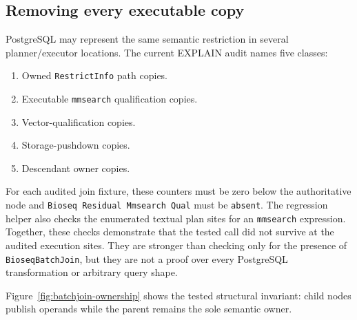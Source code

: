 \subsection{Removing every executable copy}

PostgreSQL may represent the same semantic restriction in several
planner/executor locations.  The current EXPLAIN audit names five classes:

\begin{enumerate}
  \item Owned \texttt{RestrictInfo} path copies.
  \item Executable \texttt{mmsearch} qualification copies.
  \item Vector-qualification copies.
  \item Storage-pushdown copies.
  \item Descendant owner copies.
\end{enumerate}

For each audited join fixture, these counters must be zero below the
authoritative node and \texttt{Bioseq Residual Mmsearch Qual} must be
\texttt{absent}.  The regression helper also checks the enumerated textual
plan sites for an \texttt{mmsearch} expression.  Together, these checks
demonstrate that the tested call did not survive at the audited execution
sites.  They are stronger than checking only for the presence of
\texttt{BioseqBatchJoin}, but they are not a proof over every PostgreSQL
transformation or arbitrary query shape.

Figure~\ref{fig:batchjoin-ownership} shows the tested structural invariant:
child nodes publish operands while the parent remains the sole semantic owner.

